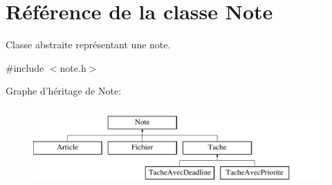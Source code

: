 \hypertarget{class_note}{\section{Référence de la classe Note}
\label{class_note}
}


Classe abstraite représentant une note.  




{\ttfamily \#include $<$note.\-h$>$}

Graphe d'héritage de Note\-:\begin{figure}[H]
\begin{center}
\leavevmode
\includegraphics[height=3.000000cm]{class_note}
\end{center}
\end{figure}
